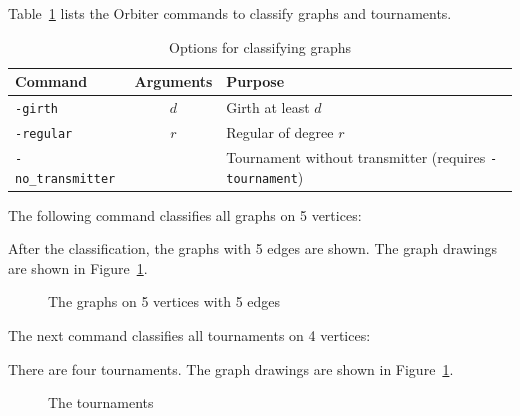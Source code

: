 \bigskip







Table~\ref{tab:graphoptions} lists the Orbiter commands to classify graphs and tournaments. 
\begin{table}
\begin{center}
\begin{tabular}{|p{4cm}|c|p{7cm}|}
\hline
Command & Arguments & Purpose \\
\hline
\hline
\verb'-girth' & $d$ & Girth at least $d$ \\
\hline  
\verb'-regular' & $r$ & Regular of degree $r$ \\
\hline
\verb'-no_transmitter' & & Tournament without transmitter (requires \verb'-tournament') \\
\hline
\end{tabular}
\end{center}
\caption{\label{tab:graphoptions}Options for classifying graphs}
\end{table}
The following command classifies all graphs on 5 vertices:
{\tt

}
After the classification, the graphs with 5 edges are shown. 
The graph drawings are shown in Figure~\ref{fig:graph:drawings:v5}.
\begin{figure}






\caption{\label{fig:graph:drawings:v5}The graphs on 5 vertices with 5 edges}
\end{figure}


\bigskip


The next command classifies all tournaments on 4 vertices:
{\tt

}
There are four tournaments. 
The graph drawings are shown in Figure~\ref{fig:graph:drawings:v5}.
\begin{figure}




\caption{\label{fig:graph:drawings:tournaments}The tournaments}
\end{figure}




